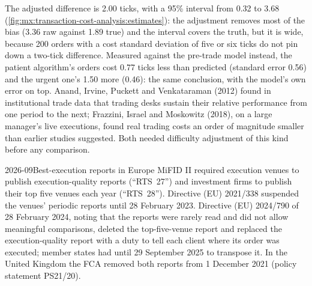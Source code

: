 \begin{omfigure}

\label{fig:mx:transaction-cost-analysis:estimates}
\end{omfigure}

The adjusted difference is 2.00 ticks, with a 95\% interval from 0.32 to 3.68 (\cref{fig:mx:transaction-cost-analysis:estimates}): the adjustment
removes most of the bias (3.36 raw against 1.89 true) and the interval covers the truth, but it is wide, because 200 orders with a cost standard
deviation of five or six ticks do not pin down a two-tick difference. Measured against the pre-trade model instead, the patient algorithm's orders
cost 0.77 ticks less than predicted (standard error 0.56) and the urgent one's 1.50 more (0.46): the same conclusion, with the model's own error on top.
Anand, Irvine, Puckett and Venkataraman (2012) found in institutional trade data that trading desks sustain their relative performance from one
period to the next; Frazzini, Israel and Moskowitz (2018), on a large manager's live executions, found real trading costs an order of magnitude
smaller than earlier studies suggested. Both needed difficulty adjustment of this kind before any comparison.

\begin{dated}{2026-09}{Best-execution reports in Europe}\label{dat:mx:transaction-cost-analysis:rts}
MiFID II required execution venues to publish execution-quality reports (``RTS~27'') and investment firms to publish their top five venues each year
(``RTS~28''). Directive (EU) 2021/338 suspended the venues' periodic reports until 28 February 2023. Directive (EU) 2024/790 of 28 February 2024, noting
that the reports were rarely read and did not allow meaningful comparisons, deleted the top-five-venue report and replaced the execution-quality report
with a duty to tell each client where its order was executed; member states had until 29 September 2025 to transpose it. In the United Kingdom the
FCA removed both reports from 1 December 2021 (policy statement PS21/20).
\end{dated}

